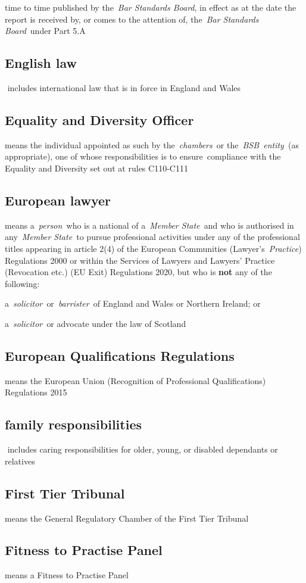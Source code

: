   time to time published by the~\emph{Bar Standards Board}, in effect as
  at the date the report is received by, or comes to the attention of,
  the~\emph{Bar Standards Board}~under Part 5.A  \subsection{English law } includes international law that is in force in
  England and Wales  \subsection{Equality and Diversity Officer } means the individual
  appointed as such by the~\emph{chambers~}or the~\emph{BSB~entity~}(as
  appropriate), one of whose responsibilities is to ensure~compliance
  with the Equality and Diversity set out at rules C110-C111  \subsection{European lawyer } means a~\emph{person~}who is a national of
  a~\emph{Member State~}and who is authorised in any~\emph{Member
  State~}to pursue professional activities under any of the professional
  titles appearing in article 2(4) of the European Communities
  (Lawyer's~\emph{Practice}) Regulations 2000 or within the Services of
  Lawyers and Lawyers' Practice (Revocation etc.) (EU Exit) Regulations
  2020, but who is \textbf{not} any of the following:~ \al \item
  a~\emph{solicitor~}or~\emph{barrister~}of England and Wales or
  Northern Ireland; or \item a~\emph{solicitor~}or advocate under the law
  of Scotland\la  \subsection{European Qualifications Regulations } means the European
  Union (Recognition of Professional Qualifications) Regulations 2015
    \subsection{family responsibilities } includes caring responsibilities
  for older, young, or disabled dependants or relatives  \subsection{First Tier Tribunal } means the General Regulatory Chamber of
  the First Tier Tribunal  \subsection{Fitness to Practise Panel } means a Fitness to Practise Panel

